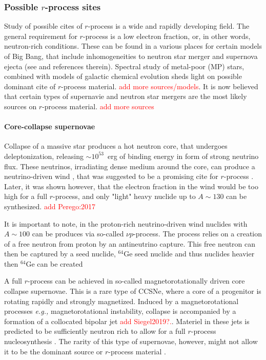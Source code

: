 \documentclass[11pt,a4paper,headinclude=true,DIV=14,BCOR=8mm,chapterprefix,listof=totoc,twoside,openright,abstracton]{scrbook}
\begin{document}

\subsubsection{Possible $r$-process sites}

Study of possible cites of $r$-process is a wide and rapidly developing field. 
The general requirement for $r$-process is a low electron fraction, or, in other words, neutron-rich conditions. These can be found in a various places for certain models of Big Bang, that include inhomogeneities to neutron star merger and supernova ejecta (see \cite{Mathews:1990} and references therein). Spectral study of metal-poor (MP) stars, combined with models of galactic chemical evolution sheds light on possible dominant cite of $r$-process material. \textcolor{red}{add more sources/models}. It is now believed that certain types of supernavie and neutron star mergers are the most likely sources on $r$-process material. \cite{Mathews:1990,Thielemann:2011} \textcolor{red}{add more sources}


\paragraph{Core-collapse supernovae}

Collapse of a massive star produces a hot neutron core, that undergoes deleptonization, releasing $\sim10^{53}$~erg of binding energy in form of strong neutrino flux. These neutrinos, irradiating dense medium around the core, can produce a neutrino-driven wind \cite{Qian:1996xt}, that was suggested to be a promising cite for $r$-process \cite{Woosley:2002,Wanajo:2006mq}. Later, it was shown however, that the electron fraction in the wind would be too high for a full $r$-process, and only "light" heavy nuclide up to $A\sim130$ can be synthesized. \cite{Qian:1996xt,Thompson:2001ys,Fischer:2010,Roberts:2010,MartinezPinedo:2012rb,Wanajo:2013} \textcolor{red}{add Perego:2017} 

It is important to note, in the proton-rich neutrino-driven wind nuclides with $A\sim 100$ can be produces via so-called $\nu p$-process. The process relies on a creation of a free neutron from proton by an antineutrino capture. This free neutron can then be captured by a seed nuclide, $^{64}$Ge seed nuclide and thus nuclides heavier then $^{64}$Ge can be created \cite{Frohlich:2006,Pruet:2005qd,Wanajo:2010mc,Arcones:2012}

A full $r$-process can be achieved in so-called magnetorotationally driven core collapse supernovae. This is a rare type of CCSNe, where a core of a progenitor is rotating rapidly and strongly magnetized. Induced by a magnetorotational processes \textit{e.g.,} magnetorotational instability, collapse is accompanied by a formation of a collocated bipolar jet \cite{Wheeler:2000,Akiyama:2003,Burrows:2007yx,Mosta:2014jaa,Mosta:2015} \textcolor{red}{add Siegel2019?.}. Materiel in these jets is predicted to be sufficiently neutron rich to allow for a full $r$-process nucleosynthesis \cite{Winteler:2012,Nishimura:2015nca}. The rarity of this type of supernovae, however, might not allow it to be the dominant source or $r$-process material \cite{Nishimura:2015nca}. 
\end{document}
